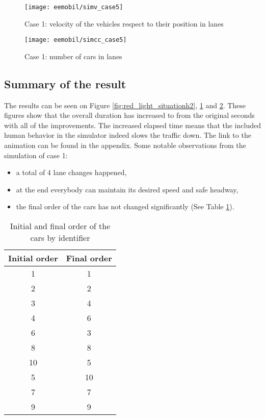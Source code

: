 			\begin{figure}
				\centering
				\texttt{[image: eemobil/simv\_case5]}
				\caption{Case 1: velocity of the vehicles respect to their position in lanes}
				\label{fig:red_light_situationv2}
			\end{figure}
			\begin{figure}
				\centering
				\texttt{[image: eemobil/simcc\_case5]}
				\caption{Case 1: number of cars in lanes}
				\label{fig:red_light_situationcc2}
			\end{figure}
			\subsection*{Summary of the result}
			The results can be seen on Figure \ref{fig:red_light_situationh2}, \ref{fig:red_light_situationv2} and \ref{fig:red_light_situationcc2}. These figures show that the overall duration has increased to from the original seconds with all of the improvements. The increased elapsed time means that the included human behavior in the simulator indeed slows the traffic down. The link to the animation can be found in the appendix.
			Some notable observations from the simulation of case 1:
			
			\begin{itemize}
				\item a total of 4 lane changes happened,
				\item at the end everybody can maintain its desired speed and safe headway,
				\item the final order of the cars has not changed significantly (See Table \ref{tab:car_order_case_1}).
			\end{itemize}
			\begin{table}
				\begin{center}
					\begin{tabular}{ |c|c| }
						\hline
						Initial order & Final order \\
						\hline
						1 & 1\\
						2 & 2\\
						3 & 4\\
						4 & 6\\
						6 & 3\\
						8 & 8\\
						10 & 5\\
						5 & 10\\
						7 & 7\\
						9 & 9\\
						\hline
					\end{tabular}
				\end{center}
				\caption{Initial and final order of the cars by identifier}
				\label{tab:car_order_case_1}
			\end{table}
